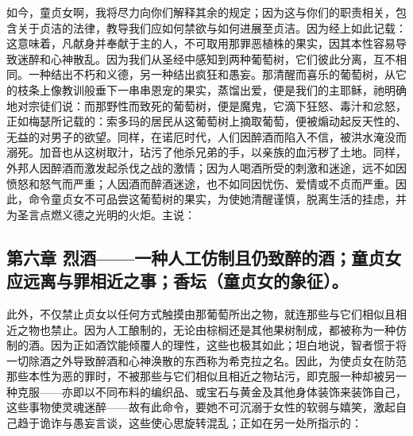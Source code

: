 如今，童贞女啊，我将尽力向你们解释其余的规定；因为这与你们的职责相关，包含关于贞洁的法律，教导我们应如何禁欲与如何进展至贞洁。因为经上如此记载：这意味着，凡献身并奉献于主的人，不可取用那罪恶植株的果实，因其本性容易导致迷醉和心神散乱。因为我们从圣经中感知到两种葡萄树，它们彼此分离，互不相同。一种结出不朽和义德，另一种结出疯狂和愚妄。那清醒而喜乐的葡萄树，从它的枝条上像教训般垂下一串串恩宠的果实，蒸馏出爱，便是我们的主耶稣，祂明确地对宗徒们说：而那野性而致死的葡萄树，便是魔鬼，它滴下狂怒、毒汁和忿怒，正如梅瑟所记载的：索多玛的居民从这葡萄树上摘取葡萄，便被煽动起反天性的、无益的对男子的欲望。同样，在诺厄时代，人们因醉酒而陷入不信，被洪水淹没而溺死。加音也从这树取汁，玷污了他杀兄弟的手，以亲族的血污秽了土地。同样，外邦人因醉酒而激发起杀伐之战的激情；因为人喝酒所受的刺激和迷途，远不如因愤怒和怒气而严重；人因酒而醉酒迷途，也不如同因忧伤、爱情或不贞而严重。因此，命令童贞女不可品尝这葡萄树的果实，为使她清醒谨慎，脱离生活的挂虑，并为圣言点燃义德之光明的火炬。主说：\par


\subsection{第六章 烈酒——一种人工仿制且仍致醉的酒；童贞女应远离与罪相近之事；香坛（童贞女的象征）。}

此外，不仅禁止贞女以任何方式触摸由那葡萄所出之物，就连那些与它们相似且相近之物也禁止。因为人工酿制的，无论由棕榈还是其他果树制成，都被称为一种仿制的酒。因为正如酒饮能倾覆人的理性，这些也极其如此；坦白地说，智者惯于将一切除酒之外导致醉酒和心神涣散的东西称为希克拉之名。因此，为使贞女在防范那些本性为恶的罪时，不被那些与它们相似且相近之物玷污，即克服一种却被另一种克服——亦即以不同布料的编织品、或宝石与黄金及其他身体装饰来装饰自己，这些事物使灵魂迷醉——故有此命令，要她不可沉溺于女性的软弱与嬉笑，激起自己趋于诡诈与愚妄言谈，这些使心思旋转混乱；正如在另一处所指示的：\par

